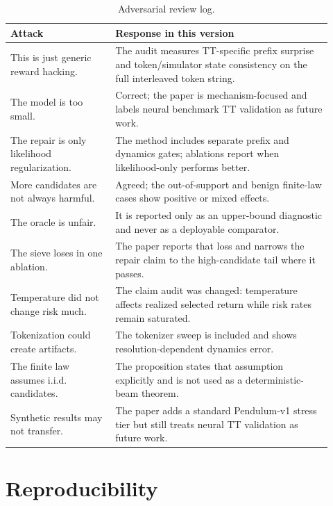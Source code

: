 \documentclass{article}
\begin{document}
\begin{table}[t]
\caption{Adversarial review log.}
\label{tab:attacks}
\begin{center}
\small
\begin{tabular}{p{0.30\linewidth}p{0.62\linewidth}}
\toprule
Attack & Response in this version \\
\midrule
This is just generic reward hacking. & The audit measures TT-specific prefix surprise and token/simulator state consistency on the full interleaved token string. \\
The model is too small. & Correct; the paper is mechanism-focused and labels neural benchmark TT validation as future work. \\
The repair is only likelihood regularization. & The method includes separate prefix and dynamics gates; ablations report when likelihood-only performs better. \\
More candidates are not always harmful. & Agreed; the out-of-support and benign finite-law cases show positive or mixed effects. \\
The oracle is unfair. & It is reported only as an upper-bound diagnostic and never as a deployable comparator. \\
The sieve loses in one ablation. & The paper reports that loss and narrows the repair claim to the high-candidate tail where it passes. \\
Temperature did not change risk much. & The claim audit was changed: temperature affects realized selected return while risk rates remain saturated. \\
Tokenization could create artifacts. & The tokenizer sweep is included and shows resolution-dependent dynamics error. \\
The finite law assumes i.i.d. candidates. & The proposition states that assumption explicitly and is not used as a deterministic-beam theorem. \\
Synthetic results may not transfer. & The paper adds a standard Pendulum-v1 stress tier but still treats neural TT validation as future work. \\
\bottomrule
\end{tabular}
\end{center}
\end{table}

\section{Reproducibility}
\end{document}
